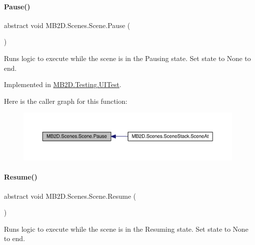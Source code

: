 \paragraph{\texorpdfstring{Pause()}{Pause()}}
{\footnotesize\ttfamily abstract void M\+B2\+D.\+Scenes.\+Scene.\+Pause (\begin{DoxyParamCaption}{ }\end{DoxyParamCaption})\hspace{0.3cm}{\ttfamily [pure virtual]}}



Runs logic to execute while the scene is in the Pausing state. Set state to None to end. 



Implemented in \hyperlink{class_m_b2_d_1_1_testing_1_1_u_i_test_ae829ddfd489047674efb3131d360901a}{M\+B2\+D.\+Testing.\+U\+I\+Test}.

Here is the caller graph for this function\+:
\nopagebreak
\begin{figure}[H]
\begin{center}
\leavevmode
\includegraphics[width=350pt]{class_m_b2_d_1_1_scenes_1_1_scene_a0661eff0223150fa8e9ea88145409e5d_icgraph}
\end{center}
\end{figure}
\hypertarget{class_m_b2_d_1_1_scenes_1_1_scene_ad13639db22b059a1b714eefd9d927735}{}\label{class_m_b2_d_1_1_scenes_1_1_scene_ad13639db22b059a1b714eefd9d927735} 
\paragraph{\texorpdfstring{Resume()}{Resume()}}
{\footnotesize\ttfamily abstract void M\+B2\+D.\+Scenes.\+Scene.\+Resume (\begin{DoxyParamCaption}{ }\end{DoxyParamCaption})\hspace{0.3cm}{\ttfamily [pure virtual]}}



Runs logic to execute while the scene is in the Resuming state. Set state to None to end. 



